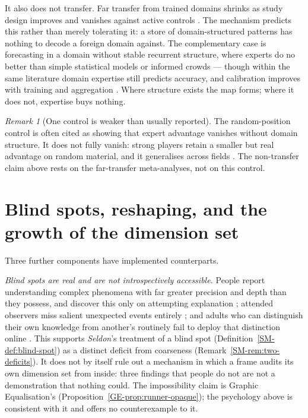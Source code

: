 \documentclass[11pt,a4paper]{article}
\theoremstyle{remark}
\newtheorem{remark}{Remark}[section]
\begin{document}
It also does not transfer. Far transfer from trained domains shrinks as study design improves and
vanishes against active controls \citep{sala2017cdps,sala2017lb,melbylervag2016}. The mechanism
predicts this rather than merely tolerating it: a store of domain-structured patterns has nothing to
decode a foreign domain against. The complementary case is forecasting in a domain without stable
recurrent structure, where experts do no better than simple statistical models or informed crowds
\citep{forecasting2023} --- though within the same literature domain expertise still predicts
accuracy, and calibration improves with training and aggregation \citep{mellers2014}. Where
structure exists the map forms; where it does not, expertise buys nothing.

\begin{remark}[One control is weaker than usually reported]\label{rem:random-boards}
The random-position control is often cited as showing that expert advantage vanishes without domain
structure. It does not fully vanish: strong players retain a smaller but real advantage on random
material, and it generalises across fields \citep{gobetsimon1996pbr,sala2017mc}. The non-transfer
claim above rests on the far-transfer meta-analyses, not on this control.
\end{remark}

\section{Blind spots, reshaping, and the growth of the dimension set}\label{sec:other}
Three further components have implemented counterparts.

\emph{Blind spots are real and are not introspectively accessible.} People report understanding
complex phenomena with far greater precision and depth than they possess, and discover this only on
attempting explanation \citep{rozenblit2002}; attended observers miss salient unexpected events
entirely \citep{simons1999}; and adults who can distinguish their own knowledge from another's
routinely fail to deploy that distinction online \citep{keysar2003}. This supports \emph{Seldon}'s
treatment of a blind spot (Definition~\ref{SM-def:blind-spot}) as a distinct deficit from coarseness
(Remark~\ref{SM-rem:two-deficits}). It does not by itself rule out a mechanism in which a frame audits
its own dimension set from inside: three findings that people do not are not a demonstration that
nothing could. The impossibility claim is Graphic Equalisation's
(Proposition~\ref{GE-prop:runner-opaque}); the psychology above is consistent with it and offers no
counterexample to it.
\end{document}

